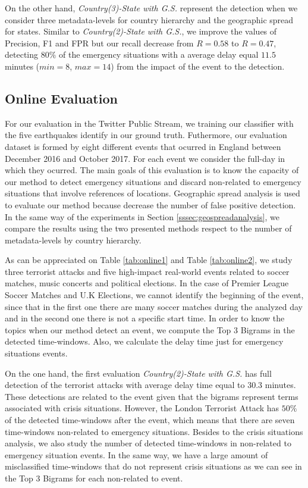 \documentclass[sigconf]{acmart}
\begin{document}
On the other hand, \textit{Country(3)-State with G.S.} represent the detection when we consider three metadata-levels for country hierarchy and the geographic spread for states. Similar to  \textit{Country(2)-State with G.S.}, we improve the values of Precision, F1 and FPR but our recall decrease from $R = 0.58$ to $R = 0.47$, detecting  $80\%$ of the emergency situations with a average delay equal $11.5$ minutes ($min=8$, $max=14$) from the impact of the event to the detection.


\subsection{Online Evaluation}
For our evaluation in the Twitter Public Stream, we training our classifier with the five earthquakes identify in our ground truth. Futhermore, our evaluation dataset is formed by eight different events that ocurred in England between December 2016 and October 2017. For each event we consider the full-day in which they ocurred. The main goals of this evaluation is to know the capacity of our method to detect emergency situations and discard non-related to emergency situations that involve references of locations. Geographic spread analysis is used to evaluate our method because decrease the number of false positive detection. In the same way of the experiments in Section \ref{sssec:geospreadanalysis}, we compare the results using the two presented methods respect to the number of metadata-levels by country hierarchy.

As can be appreciated on Table \ref{tab:online1} and Table \ref{tab:online2}, we study three terrorist attacks and five high-impact real-world events related to soccer matches, music concerts and political elections. In the case of Premier League Soccer Matches and U.K Elections, we cannot identify the beginning of the event, since that in the first one there are many soccer matches during the analyzed day and in the second one there is not a specific start time. In order to know the topics when our method detect an event, we compute the Top 3 Bigrams in the detected time-windows. Also, we calculate the delay time just for emergency situations events.

On the one hand, the first evaluation \textit{Country(2)-State with G.S.} has full detection of the terrorist attacks with average delay time equal to $30.3$ minutes. These detections are related to the event given that the bigrams represent terms associated with crisis situations. However, the London Terrorist Attack has $50\%$ of the detected time-windows after the event, which means that there are seven time-windows non-related to emergency situations. Besides to the crisis situations analysis, we also study the number of detected time-windows in non-related to emergency situation events. In the same way, we have a large amount of misclassified time-windows that do not represent crisis situations as we can see in the Top 3 Bigrams for each non-related to event.
\end{document}
